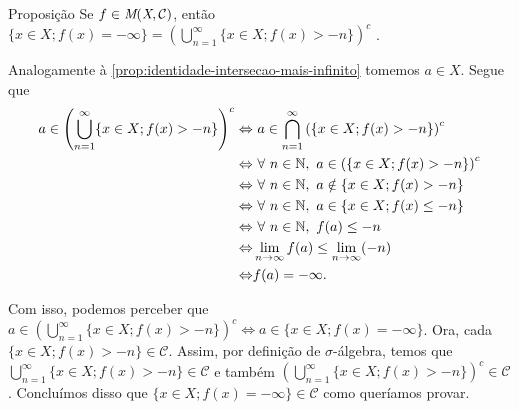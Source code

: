     \begin{env}{Proposição}
    \label{prop:identidade-união-menos-infinito}
        Se $f \in \operatorname{\textit{M}(\textit{X}, \mathcal{C} )}$, então $\{x \in X; f(x) = -\infty\} = \displaystyle \left(\bigcup_{n = 1}^\infty \{x \in X; f(x) > - n\}\right)^c$
        \cite{bartle}.
        \vspace{-0.4cm}
    \end{env}
    \begin{prova}
    	
    	\vspace{-0.6cm}
        Analogamente à \ref{prop:identidade-intersecao-mais-infinito} tomemos $a \in X$. 
        Segue que 
        \begin{align*}
            a \in \left(\bigcup_{n = 1}^\infty \{x \in X; f(x) > - n\}\right)^c
            \Leftrightarrow & \ a \in \bigcap_{n = 1}^\infty \left(\{x \in X; f(x) > - n\}\right)^c\\
            \Leftrightarrow & \ \forall \ n \in \operatorname{\mathbb{N}},\ a \in \left(\{x \in X; f(x) > - n\}\right)^c\\
            \Leftrightarrow & \ \forall \ n \in \operatorname{\mathbb{N}},\ a \notin \{x \in X; f(x) > - n\}\\
            \Leftrightarrow & \ \forall \ n \in \operatorname{\mathbb{N}},\ a \in \{x \in X; f(x) \leq - n\}\\    
            \Leftrightarrow & \ \forall \ n \in \operatorname{\mathbb{N}},\ f(a) \leq - n\\
            \Leftrightarrow & \lim_{n \to \infty} f(a) \leq \lim_{n \to \infty} (- n)\\  
            \Leftrightarrow & f(a) = -\infty.                  
        \end{align*}
    
    Com isso, podemos perceber que 
    $\displaystyle a \in \left(\bigcup_{n = 1}^\infty \{x \in X; f(x) > - n\}\right)^c \Leftrightarrow  a \in \{x \in X; f(x) = -\infty\}$.
    Ora, cada $\{x \in X; f(x) > - n\} \in \mathcal{C}$.
    Assim, por definição de $\sigma$-álgebra, temos que $ \displaystyle\bigcup_{n = 1}^\infty \{x \in X; f(x) > - n\} \in \mathcal{C}$ e também 
    $\displaystyle\left(\bigcup_{n = 1}^\infty \{x \in X; f(x) > - n\}\right)^c \in \mathcal{C}$.
    Concluímos disso que $\{x \in X; f(x) = -\infty\} \in \mathcal{C}$ como queríamos provar. 
    \end{prova}
